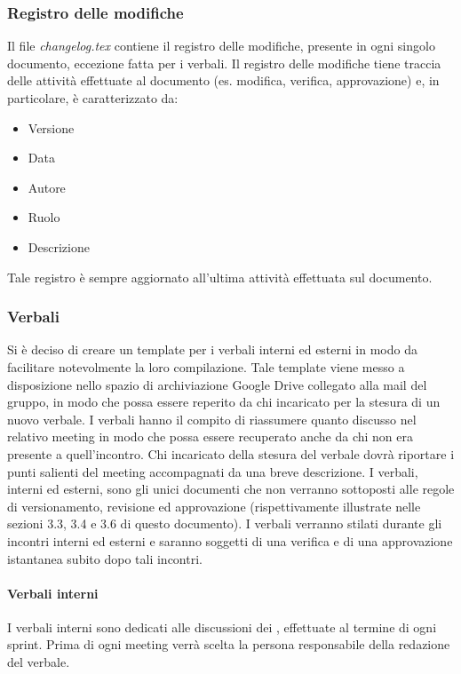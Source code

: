 \subsubsection{Registro delle modifiche}
Il file \textit{changelog.tex} contiene il registro delle modifiche, presente in ogni singolo documento, eccezione fatta per i verbali. 
Il registro delle modifiche tiene traccia delle attività effettuate al documento (es. modifica, verifica, approvazione) e, in particolare, è caratterizzato da:
\begin{itemize}
\item Versione
\item Data
\item Autore
\item Ruolo
\item Descrizione
\end{itemize}

Tale registro è sempre aggiornato all'ultima attività effettuata sul documento.

\subsubsection{Verbali}
Si è deciso di creare un template per i verbali interni ed esterni in modo da facilitare notevolmente la loro compilazione. Tale template viene messo a disposizione nello spazio di archiviazione  Google Drive\glo{} collegato alla mail del gruppo, in modo che possa essere reperito da chi incaricato per la stesura di un nuovo verbale.
I verbali hanno il compito di riassumere quanto discusso nel relativo meeting in modo che possa essere recuperato anche da chi non era presente a quell'incontro.
Chi incaricato della stesura del verbale dovrà riportare i punti salienti del meeting accompagnati da una breve descrizione.
I verbali, interni ed esterni, sono gli unici documenti che non verranno sottoposti alle regole di versionamento, revisione ed approvazione (rispettivamente illustrate nelle sezioni 3.3, 3.4 e
3.6 di questo documento). I verbali verranno stilati durante gli incontri interni ed esterni e saranno soggetti di una verifica e di una approvazione istantanea subito dopo tali incontri.

\paragraph{Verbali interni}
I verbali interni sono dedicati alle discussioni dei \groupName{}, effettuate al termine di ogni sprint. Prima di ogni meeting verrà scelta la persona responsabile della redazione del verbale. 

